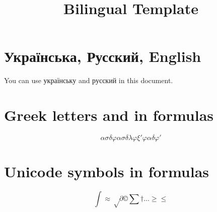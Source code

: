 
\title{Bilingual Template}
\maketitle

\section{Українська, Русский, English}

You can use українську and русский in this document.

\section{Greek letters and in formulas}
	\[ασδφ ασδλφξ 'φα δφ'\]
\section{Unicode symbols in formulas}
	\[∫≈√∂©∑†…≥≤\]



